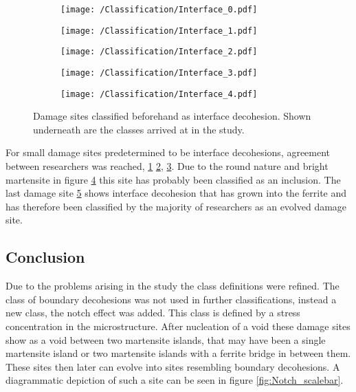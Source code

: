 \begin{figure}[H]
\begin{subfigure}{.2\textwidth}
\centering
  \texttt{[image: /Classification/Interface\_0.pdf]}
  \caption{}
  \label{fig:ID1}
\end{subfigure}%
\begin{subfigure}{.2\textwidth}
\centering
  \texttt{[image: /Classification/Interface\_1.pdf]}
  \caption{}
  \label{fig:ID2}
\end{subfigure}%
\centering
\begin{subfigure}{.2\textwidth}
\centering
  \texttt{[image: /Classification/Interface\_2.pdf]}
  \caption{}
  \label{fig:ID3}
\end{subfigure}%
\begin{subfigure}{.2\textwidth}
\centering
  \texttt{[image: /Classification/Interface\_3.pdf]}
  \caption{}
  \label{fig:ID4}
\end{subfigure}%
\begin{subfigure}{.2\textwidth}
\centering
  \texttt{[image: /Classification/Interface\_4.pdf]}
  \caption{}
  \label{fig:ID5}
\end{subfigure}%
\caption{Damage sites classified beforehand as interface decohesion. Shown underneath are the classes arrived at in the study.}
\label{fig:IDStudy}
\end{figure}

For small damage sites predetermined to be interface decohesions, agreement between researchers was reached, \ref{fig:ID1} \ref{fig:ID2}, \ref{fig:ID3}. Due to the round nature and bright martensite in figure \ref{fig:ID4} this site has probably been classified as an inclusion. The last damage site \ref{fig:ID5} shows interface decohesion that has grown into the ferrite and has therefore been classified by the majority of researchers as an evolved damage site. 

\subsection{Conclusion}
\label{sec:NotchIntroduction}
Due to the problems arising in the study the class definitions were refined. The class of boundary decohesions was not used in further classifications, instead a new class, the notch effect was added. This class is defined by a stress concentration in the microstructure. After nucleation of a void these damage sites show as a void between two martensite islands, that may have been a single martensite island or two martensite islands with a ferrite bridge in between them. These sites then later can evolve into sites resembling boundary decohesions. A diagrammatic depiction of such a site can be seen in figure \ref{fig:Notch_scalebar}. \\

